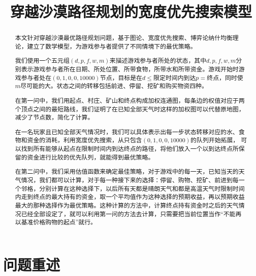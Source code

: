 \documentclass[withoutpreface,bwprint]{cumcmthesis} %
\title{穿越沙漠路径规划的宽度优先搜索模型}
\begin{document}
    \maketitle
    \begin{abstract}
        本文针对穿越沙漠最优路径规划问题，基于图论、宽度优先搜索、博弈论纳什均衡理论，建立了数学模型，为游戏参与者提供了不同情境下的最优策略。

        我们使用一个五元组\((d,p,f,w,m)\)来描述游戏参与者所处的状态，其中\(d,p,f,w,m\)分别表示游戏参与者所在日期、所处位置、所带食物，所带水和所带资金。游戏开始时游戏参与者处在\((0,1,0,0,10000)\)节点，目标是在\(d\leq\)限定时间内到达\(p=\)终点，同时使\(m\)尽可能的大。状态之间的转移包括前进、停留、挖矿和购买物资四种。

        在第一问中，我们用起点、村庄、矿山和终点构成加权连通图，每条边的权值对应于两个顶点之间的最短路线，我们证明了在已知全部天气时这样的加权图可以代替原地图，减少了节点数，简化了计算。

        在一名玩家且已知全部天气情况时，我们可以具体表示出每一步状态转移对应的水、食物和资金的消耗，利用宽度优先搜索，从只包含\((0,1,0,0,10000)\)的队列开始拓展，
        可以找到所有能够从起点在限制时间内到达终点的路径，将他们放入一个以到达终点所保留的资金进行比较的优先队列，就能得到最优策略。

        在第二问中，我们采用估值函数来确定最佳策略，对于游戏中的每一天，已知当天的天气情况，我们都可以计算，对于每一种接下来的选择：停留、购物、挖矿、前进到每一个邻格，分别计算在这种选择下，以后所有天都是晴朗天气和都是高温天气时限制时间内走到终点的最大持有的资金，取一个平均值作为这种选择的预期收益，再以预期收益最大的那种选择作为最优策略。这种计算的方法中，计算终点持有资金时之后的天气情况已经全部设定了，就可以利用第一问的方法去计算，只需要把当前位置当作“不能再以基准价格购物的起点”就行。


\end{abstract}



\section{问题重述}
\end{document}
